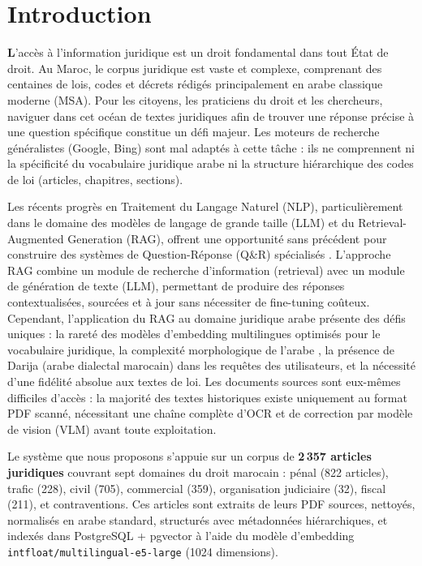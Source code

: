 \section{Introduction}

\noindent\textcolor{titleblue}{\Large\bfseries L}'accès à l'information juridique est un droit
fondamental dans tout État de droit. Au Maroc, le corpus juridique est vaste et
complexe, comprenant des centaines de lois, codes et décrets rédigés
principalement en arabe classique moderne (MSA). Pour les citoyens, les
praticiens du droit et les chercheurs, naviguer dans cet océan de textes
juridiques afin de trouver une réponse précise à une question spécifique
constitue un défi majeur. Les moteurs de recherche généralistes (Google, Bing)
sont mal adaptés à cette tâche : ils ne comprennent ni la spécificité du
vocabulaire juridique arabe ni la structure hiérarchique des codes de loi
(articles, chapitres, sections).

\vspace{0.2cm}

\noindent Les récents progrès en Traitement du Langage Naturel (NLP),
particulièrement dans le domaine des modèles de langage de grande taille (LLM)
et du Retrieval-Augmented Generation (RAG), offrent une opportunité sans
précédent pour construire des systèmes de Question-Réponse (Q\&R) spécialisés
\cite{lewis2020retrieval}. L'approche RAG combine un module de recherche
d'information (retrieval) avec un module de génération de texte (LLM), permettant
de produire des réponses contextualisées, sourcées et à jour sans nécessiter de
fine-tuning coûteux. Cependant, l'application du RAG au domaine juridique arabe
présente des défis uniques : la rareté des modèles d'embedding multilingues
optimisés pour le vocabulaire juridique, la complexité morphologique de l'arabe
\cite{habash2010arabic}, la présence de Darija (arabe dialectal marocain) dans
les requêtes des utilisateurs, et la nécessité d'une fidélité absolue aux textes
de loi. Les documents sources sont eux-mêmes difficiles d'accès : la majorité
des textes historiques existe uniquement au format PDF scanné, nécessitant une
chaîne complète d'OCR et de correction par modèle de vision (VLM) avant toute
exploitation.

\vspace{0.2cm}

\noindent Le système que nous proposons s'appuie sur un corpus de \textbf{2\,357
articles juridiques} couvrant sept domaines du droit marocain : pénal (822
articles), trafic (228), civil (705), commercial (359), organisation judiciaire
(32), fiscal (211), et contraventions. Ces articles sont extraits de leurs PDF
sources, nettoyés, normalisés en arabe standard, structurés avec métadonnées
hiérarchiques, et indexés dans PostgreSQL + pgvector à l'aide du modèle
d'embedding \texttt{intfloat/multilingual-e5-large} (1024 dimensions).

